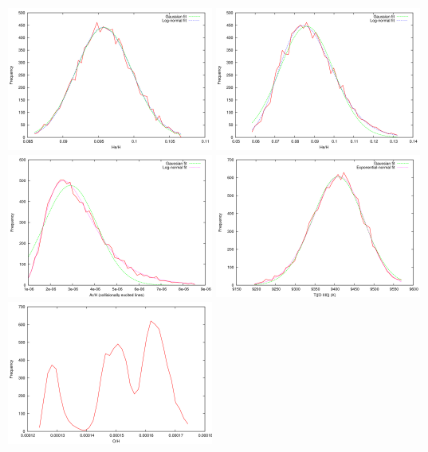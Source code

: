 \documentclass[useAMS,usenatbib]{mn2e}
\begin{document}
\begin{figure}
\includegraphics[width=0.48\textwidth]{figures/plot_binned_orion_esteban2004_He_abund_ORL.png}
\includegraphics[width=0.48\textwidth]{figures/plot_binned_B11_neat_He_abund_ORL.png}
\includegraphics[width=0.48\textwidth]{figures/binned_Cn3-1_Ar_abund_CEL.png}
\includegraphics[width=0.48\textwidth]{figures/binned_NGC6803_[OIII]_temp.png}
\includegraphics[width=0.48\textwidth]{figures/plot_binned_Sp4-1_O_abund_CEL.png}

\end{figure}
\end{document}
